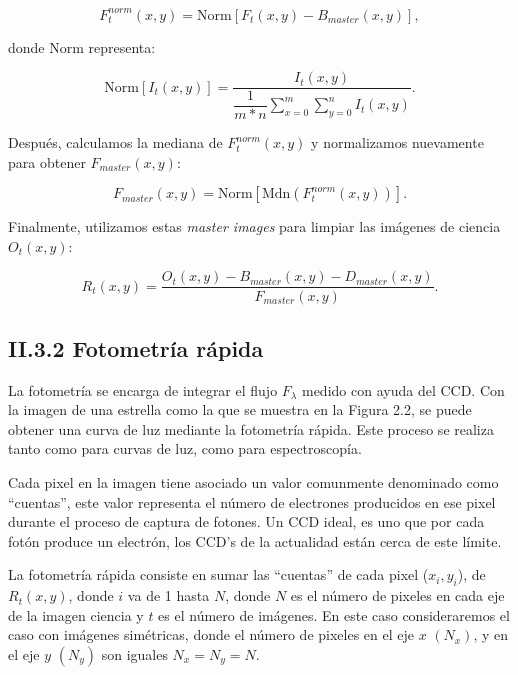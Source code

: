 \begin{equation}
  \displaystyle F^{norm}_{t}(x,y) = \mbox{Norm} \left[ F_{t}(x,y) - B_{master}(x,y)\right],
\end{equation}

donde $\mbox{Norm}$ representa:

\begin{equation}
  \displaystyle \mbox{Norm}\left[I_{t}(x,y)\right] =  \dfrac{I_{t}(x,y)}{\dfrac{1}{m*n} \sum_{x=0}^{m}\sum_{y=0}^{n} I_{t}(x,y)}.
\end{equation}

Después, calculamos la mediana de $F^{norm}_{t}(x,y)$ y normalizamos nuevamente para obtener $F_{master}(x,y)$:

\begin{equation}
  \displaystyle F_{master}(x,y) = \mbox{Norm} \left[ \mbox{Mdn} \left( F^{norm}_{t}(x,y)\right)\right].
\end{equation}

Finalmente, utilizamos estas \textit{master images} para limpiar las imágenes de ciencia $O_{t}(x,y)$:

\begin{equation}
  \displaystyle R_{t}(x,y) = \dfrac{O_{t}(x,y) - B_{master}(x,y) - D_{master}(x,y)}{F_{master}(x,y)}.
\end{equation}

\subsection*{II.3.2 Fotometría rápida}

La fotometría se encarga de integrar el flujo $F_{\lambda}$ medido con ayuda del CCD. Con la imagen de una estrella como la que se muestra en la Figura 2.2, se puede obtener una curva de luz mediante la fotometría rápida. Este proceso se realiza tanto como para curvas de luz, como para espectroscopía.

Cada pixel en la imagen tiene asociado un valor comunmente denominado como ``cuentas'', este valor representa el número de electrones producidos en ese pixel durante el proceso de captura de fotones. Un CCD ideal, es uno que por cada fotón produce un electrón, los CCD's de la actualidad están cerca de este límite.

La fotometría rápida consiste en sumar las ``cuentas'' de cada pixel ($x_{i},y_{i}$), de $R_{t}(x,y) $, donde $ i $ va de 1 hasta $ N $, donde $ N $ es el número de pixeles en cada eje de la imagen ciencia  y $ t $ es el número de imágenes. En este caso consideraremos el caso con imágenes simétricas, donde el número de pixeles en el eje $x$ $(N_{x})$, y en el eje $y$ $(N_{y})$ son iguales $N_{x}=N_{y}=N$. 

